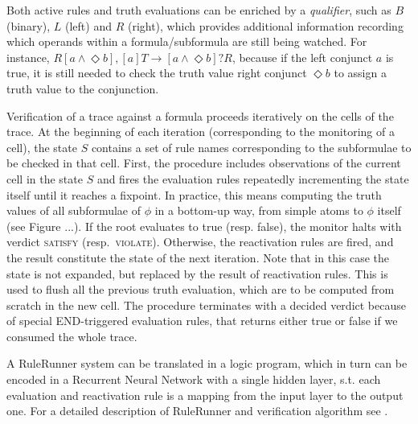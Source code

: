 
\noindent
Both active rules and truth evaluations can be enriched by a \emph{qualifier}, such as $B$ (binary), $L$ (left) and $R$ (right), which provides additional information recording which operands within a formula/subformula are still being watched. For instance, $R[a \land \Diamond b], [a]T \rightarrow [a \land \Diamond b] ? R$, because if the left conjunct $a$ is true, it is still needed to check the truth value right conjunct $\Diamond b$ to assign a truth value to the conjunction.


Verification of a trace against a formula proceeds iteratively on the cells of the trace. At the beginning of each iteration (corresponding to the monitoring of a cell), the state $S$ contains a set of rule names corresponding to the subformulae to be checked in that cell. First, the procedure includes observations of the current cell in the state $S$ and fires the evaluation rules repeatedly incrementing the state itself until it reaches a fixpoint. In practice, this means computing the truth values of all subformulae of $\phi$ in a bottom-up way, from simple atoms to $\phi$ itself (see Figure ...). If the root evaluates to true (resp. false), the monitor halts with verdict \textsc{satisfy} (resp.\ \textsc{violate}). Otherwise, the reactivation rules are fired, and the result constitute the state of the next iteration. Note that in this case the state is not expanded, but replaced by the result of reactivation rules. This is used to flush all the previous truth evaluation, which are to be computed from scratch in the new cell. The procedure terminates with a decided verdict because of special END-triggered evaluation rules, that returns either true or false if we consumed the whole trace. 

A RuleRunner system can be translated in a logic program, which in turn can be encoded in a Recurrent Neural Network with a single hidden layer, s.t. each evaluation and reactivation rule is a mapping from the input layer to the output one. For a detailed description of RuleRunner and verification algorithm see \cite{perotti2014neural,perotti2015runtime}.


